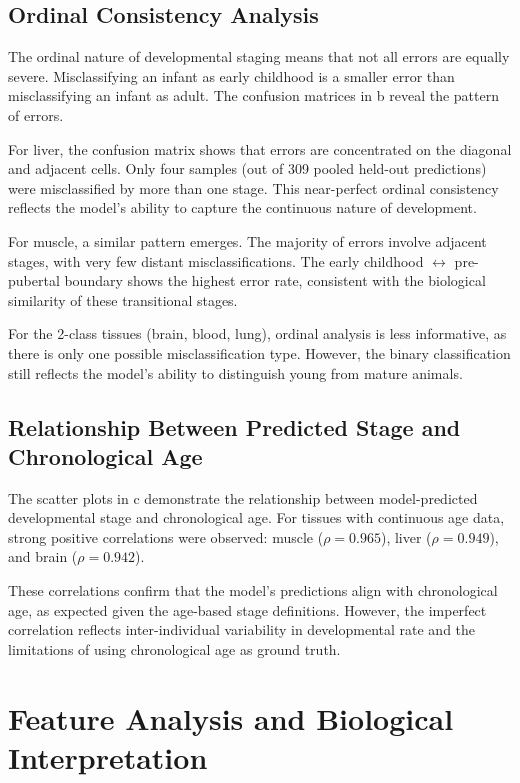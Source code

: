 \subsection{Ordinal Consistency Analysis}

The ordinal nature of developmental staging means that not all errors are equally severe. Misclassifying an infant as early childhood is a smaller error than misclassifying an infant as adult. The confusion matrices in b reveal the pattern of errors.

For liver, the confusion matrix shows that errors are concentrated on the diagonal and adjacent cells. Only four samples (out of 309 pooled held-out predictions) were misclassified by more than one stage. This near-perfect ordinal consistency reflects the model's ability to capture the continuous nature of development.

For muscle, a similar pattern emerges. The majority of errors involve adjacent stages, with very few distant misclassifications. The early childhood $\leftrightarrow$ pre-pubertal boundary shows the highest error rate, consistent with the biological similarity of these transitional stages.

For the 2-class tissues (brain, blood, lung), ordinal analysis is less informative, as there is only one possible misclassification type. However, the binary classification still reflects the model's ability to distinguish young from mature animals.

\subsection{Relationship Between Predicted Stage and Chronological Age}

The scatter plots in c demonstrate the relationship between model-predicted developmental stage and chronological age. For tissues with continuous age data, strong positive correlations were observed: muscle ($\rho = 0.965$), liver ($\rho = 0.949$), and brain ($\rho = 0.942$).

These correlations confirm that the model's predictions align with chronological age, as expected given the age-based stage definitions. However, the imperfect correlation reflects inter-individual variability in developmental rate and the limitations of using chronological age as ground truth.


\section{Feature Analysis and Biological Interpretation}\label{sec:results:features}

